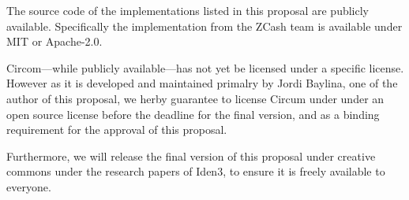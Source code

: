 {\color{purple}The source code of the implementations listed in this proposal are publicly available.
Specifically the implementation from the ZCash team is available under MIT or Apache-2.0.

Circom---while publicly available---has not yet be licensed under a specific license.
However as it is developed and maintained primalry by Jordi Baylina, one of the author of this proposal,
we herby guarantee to license Circum under under an open source license before the deadline for the final version,
and as a binding requirement for the approval of this proposal.

Furthermore, we will release the final version of this proposal under creative commons
under the research papers of Iden3, to ensure it is freely available to everyone.}
